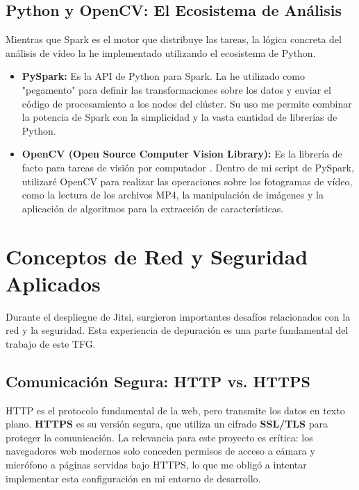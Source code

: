 \subsection{Python y OpenCV: El Ecosistema de Análisis}
Mientras que Spark es el motor que distribuye las tareas, la lógica concreta del análisis de vídeo la he implementado utilizando el ecosistema de Python.
\begin{itemize}
    \item \textbf{PySpark:} Es la API de Python para Spark. La he utilizado como "pegamento" para definir las transformaciones sobre los datos y enviar el código de procesamiento a los nodos del clúster. Su uso me permite combinar la potencia de Spark con la simplicidad y la vasta cantidad de librerías de Python.
    \item \textbf{OpenCV (Open Source Computer Vision Library):} Es la librería de facto para tareas de visión por computador \cite{opencv_library}. Dentro de mi script de PySpark, utilizaré OpenCV para realizar las operaciones sobre los fotogramas de vídeo, como la lectura de los archivos MP4, la manipulación de imágenes y la aplicación de algoritmos para la extracción de características.
\end{itemize}

\section{Conceptos de Red y Seguridad Aplicados}
\label{sec:conceptos_red_seguridad}
Durante el despliegue de Jitsi, surgieron importantes desafíos relacionados con la red y la seguridad. Esta experiencia de depuración es una parte fundamental del trabajo de este TFG.

\subsection{Comunicación Segura: HTTP vs. HTTPS}
HTTP es el protocolo fundamental de la web, pero transmite los datos en texto plano. \textbf{HTTPS} es su versión segura, que utiliza un cifrado \textbf{SSL/TLS} para proteger la comunicación. La relevancia para este proyecto es crítica: los navegadores web modernos solo conceden permisos de acceso a cámara y micrófono a páginas servidas bajo HTTPS, lo que me obligó a intentar implementar esta configuración en mi entorno de desarrollo.

